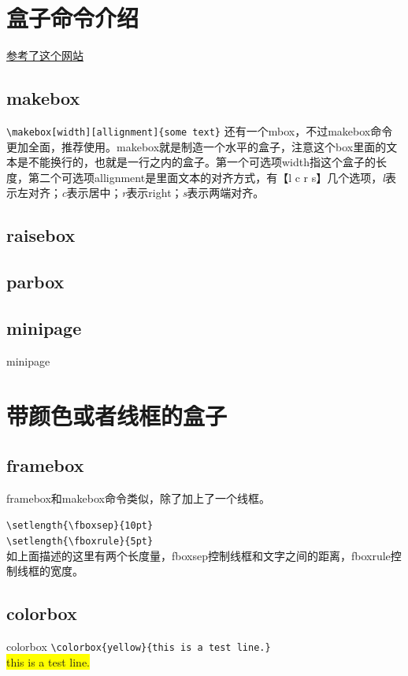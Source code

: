 \documentclass[11pt,oneside]{book}
\begin{document}
\begin{common-format}
\section{盒子命令介绍}
\href{http://tex.stackexchange.com/questions/83930/what-are-the-different-kinds-of-boxes-in-latex}{参考了这个网站}

\subsection{makebox}
\verb+\makebox[width][allignment]{some text}+
还有一个mbox，不过makebox命令更加全面，推荐使用。makebox就是制造一个水平的盒子，注意这个box里面的文本是不能换行的，也就是一行之内的盒子。第一个可选项width指这个盒子的长度，第二个可选项allignment是里面文本的对齐方式，有【l c r s】几个选项，\emph{l}表示左对齐；\emph{c}表示居中；\emph{r}表示right；\emph{s}表示两端对齐。



\subsection{raisebox}
\subsection{parbox}
\subsection{minipage}
minipage


\section{带颜色或者线框的盒子}
\subsection{framebox}
framebox和makebox命令类似，除了加上了一个线框。

\verb+\setlength{\fboxsep}{10pt}+\\
\verb+\setlength{\fboxrule}{5pt}+\\
如上面描述的这里有两个长度量，fboxsep控制线框和文字之间的距离，fboxrule控制线框的宽度。


\subsection{colorbox}
colorbox
\verb+\colorbox{yellow}{this is a test line.}+\\
\colorbox{yellow}{this is a test line.}


\end{common-format}
\end{document}
